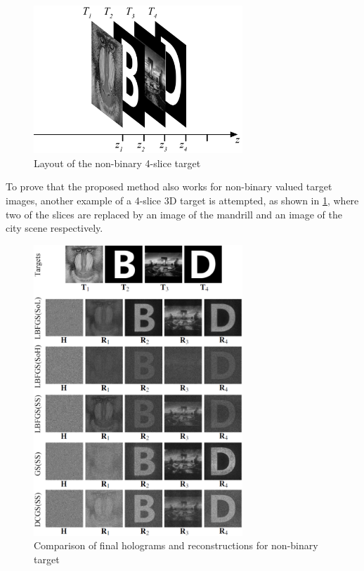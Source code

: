 \begin{figure}[H]
	\centering
	\includegraphics[width=0.7\textwidth]{Fresnel_slice_mandrill_B_szzx_D}
	\caption{Layout of the non-binary 4-slice target}
	\label{fig:more_difficult_3d_target_layout}
\end{figure}

To prove that the proposed method also works for non-binary valued target images, another example of a 4-slice 3D target is attempted, as shown in \cref{fig:more_difficult_3d_target_layout}, where two of the slices are replaced by an image of the mandrill \cite{MANDRILL_REF} and an image of the city scene \cite{Zhang2017} respectively.

\begin{figure}[H]
	\centering
	\includegraphics[width=0.7\textwidth]{final_holograms_reconstructions_4_slice_non_binary}
	\caption{Comparison of final holograms and reconstructions for non-binary target}
	\label{fig:more_difficult_3d_target_recon}
\end{figure}

